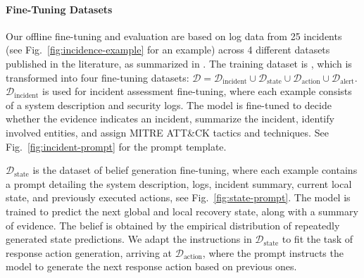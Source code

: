 \documentclass[sigconf]{acmart}
\begin{document}
\paragraph{Fine-Tuning Datasets}
Our offline fine-tuning and evaluation are based on log data from 25 incidents (see Fig.~\ref{fig:incidence-example} for an example) across 4 different datasets published in the literature, as summarized in . The training dataset is \cite{kim24dataset}, which is transformed into four fine-tuning datasets: $\mathcal{D}=\mathcal{D}_{\mathrm{incident}}
      \cup
      \mathcal{D}_{\mathrm{state}}
      \cup
      \mathcal{D}_{\mathrm{action}}
      \cup
      \mathcal{D}_{\mathrm{alert}}$. $\mathcal{D}_{\mathrm{incident}}$ is used for incident assessment fine-tuning, where each example consists of a system description and security logs. The model is fine-tuned to decide whether the evidence indicates an incident, summarize the incident, identify involved entities, and assign MITRE ATT\&CK tactics and techniques. See Fig.~\ref{fig:incident-prompt} for the prompt template.

$\mathcal{D}_{\mathrm{state}}$ is the dataset of belief generation fine-tuning, where each example contains a prompt detailing the system
      description, logs, incident summary, current local state, and previously
      executed actions, see Fig.~\ref{fig:state-prompt}. The model is trained to predict the next global and local recovery state, along with a summary of evidence. The belief is obtained by the empirical distribution of repeatedly generated state predictions. We adapt the instructions in $\mathcal{D}_{\mathrm{state}}$ to fit the task of response action generation, arriving at $\mathcal{D}_{\mathrm{action}}$, where the prompt instructs the model to generate the next response action based on previous ones. 
\end{document}
